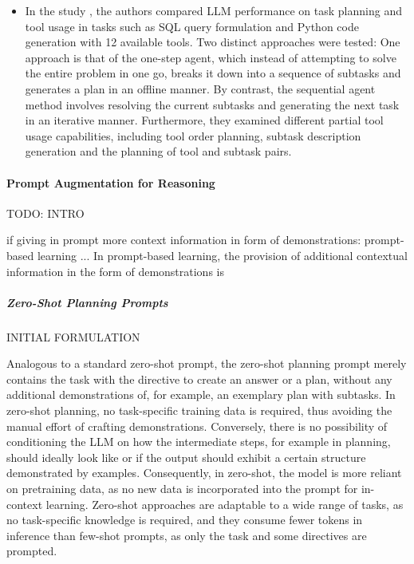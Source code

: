 \documentclass{article}
\begin{document}
\begin{itemize}
	\item In the study \cite{ruan_tptu_2023}, the authors compared LLM performance on task planning and tool usage in tasks such as SQL query formulation and Python code generation with 12 available tools. Two distinct approaches were tested: One approach is that of the one-step agent, which instead of attempting to solve the entire problem in one go, breaks it down into a sequence of subtasks and generates a plan in an offline manner. By contrast, the sequential agent method involves resolving the current subtasks and generating the next task in an iterative manner. Furthermore, they examined different partial tool usage capabilities, including tool order planning, subtask description generation and the planning of tool and subtask pairs.
\end{itemize}





\paragraph{Prompt Augmentation for Reasoning}

TODO: INTRO

if giving in prompt more context information in form of demonstrations: prompt-based learning ... 
In prompt-based learning, the provision of additional contextual information in the form of demonstrations is


\subparagraph{Zero-Shot Planning Prompts}
INITIAL FORMULATION

Analogous to a standard zero-shot prompt, the zero-shot planning prompt merely contains the task with the directive to create an answer or a plan, without any additional demonstrations of, for example, an exemplary plan with subtasks. In zero-shot planning, no task-specific training data is required, thus avoiding the manual effort of crafting demonstrations. Conversely, there is no possibility of conditioning the LLM on how the intermediate steps, for example in planning, should ideally look like or if the output should exhibit a certain structure demonstrated by examples. Consequently, in zero-shot, the model is more reliant on pretraining data, as no new data is incorporated into the prompt for in-context learning. Zero-shot approaches are adaptable to a wide range of tasks, as no task-specific knowledge is required, and they consume fewer tokens in inference than few-shot prompts, as only the task and some directives are prompted.
\end{document}

